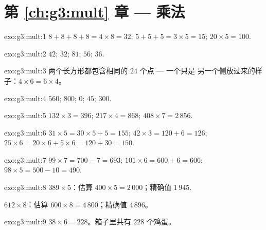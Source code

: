 \section*{第 \ref{ch:g3:mult} 章 --- 乘法}

\begin{solution}{exo:g3:mult:1}
$8 + 8 + 8 + 8 = 4 \times 8 = 32$; \quad
$5 + 5 + 5 = 3 \times 5 = 15$; \quad
$20 \times 5 = 100$.
\end{solution}

\begin{solution}{exo:g3:mult:2}
$42$; \quad $32$; \quad $81$; \quad $56$; \quad $36$.
\end{solution}

\begin{solution}{exo:g3:mult:3}
两个长方形都包含相同的 $24$ 个点 --- 一个只是
另一个侧放过来的样子：$4 \times 6 = 6 \times 4$。
\end{solution}

\begin{solution}{exo:g3:mult:4}
$560$; \quad $800$; \quad $0$; \quad $45$; \quad $300$.
\end{solution}

\begin{solution}{exo:g3:mult:5}
$132 \times 3 = 396$; \quad
$217 \times 4 = 868$; \quad
$408 \times 7 = 2\,856$.
\end{solution}

\begin{solution}{exo:g3:mult:6}
$31 \times 5 = 30 \times 5 + 5 = 155$; \quad
$42 \times 3 = 120 + 6 = 126$; \quad
$25 \times 6 = 20 \times 6 + 5 \times 6 = 120 + 30 = 150$.
\end{solution}

\begin{solution}{exo:g3:mult:7}
$99 \times 7 = 700 - 7 = 693$; \quad
$101 \times 6 = 600 + 6 = 606$; \quad
$98 \times 5 = 500 - 10 = 490$.
\end{solution}

\begin{solution}{exo:g3:mult:8}
$389 \times 5$：估算 $400 \times 5 = 2\,000$；精确值
$1\,945$.

$612 \times 8$：估算 $600 \times 8 = 4\,800$；精确值 $4\,896$。
\end{solution}

\begin{solution}{exo:g3:mult:9}
$38 \times 6 = 228$。箱子里共有 $228$ 个鸡蛋。
\end{solution}


